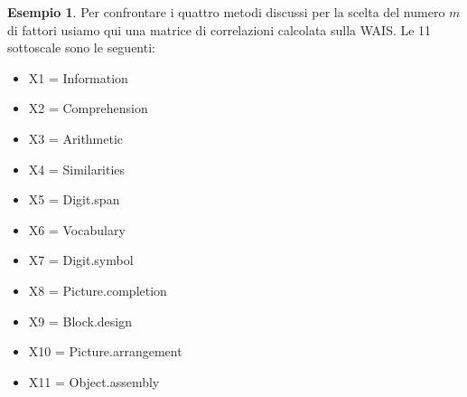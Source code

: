 \documentclass[
  11pt,
]{krantz}
\providecommand{\tightlist}{%
  \setlength{\itemsep}{0pt}\setlength{\parskip}{0pt}}
\theoremstyle{definition}
\theoremstyle{definition}
\newtheorem{example}{Esempio}[chapter]
\theoremstyle{definition}
\theoremstyle{definition}
\theoremstyle{remark}
\begin{document}
\begin{example}
Per confrontare i quattro metodi discussi per la scelta del numero \(m\) di fattori usiamo qui una matrice di correlazioni calcolata sulla WAIS. Le 11 sottoscale sono le seguenti:

\begin{itemize}
\tightlist
\item
  X1 = Information
\item
  X2 = Comprehension
\item
  X3 = Arithmetic
\item
  X4 = Similarities
\item
  X5 = Digit.span
\item
  X6 = Vocabulary
\item
  X7 = Digit.symbol
\item
  X8 = Picture.completion
\item
  X9 = Block.design
\item
  X10 = Picture.arrangement
\item
  X11 = Object.assembly
\end{itemize}


\end{example}
\end{document}
